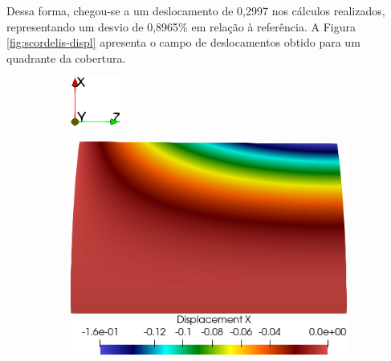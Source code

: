 Dessa forma, chegou-se a um deslocamento de 0,2997 nos cálculos realizados, representando um desvio de 0,8965\% em relação à referência. A Figura \ref{fig:scordelis-displ} apresenta o campo de deslocamentos obtido para um quadrante da cobertura.

\begin{figure}[h!]
    \centering
    \caption{\textit{Scordelis-Lo roof} - Campos de deslocamentos obtidos.}
    \begin{subfigure}{0.05\textwidth}
        \includegraphics[width=\linewidth]{Figuras/scordelis/eixos.png}
    \end{subfigure}
    \begin{subfigure}{0.31\textwidth}
        \includegraphics[width=\linewidth]{Figuras/scordelis/ux.png}

\end{subfigure}
\end{figure}
